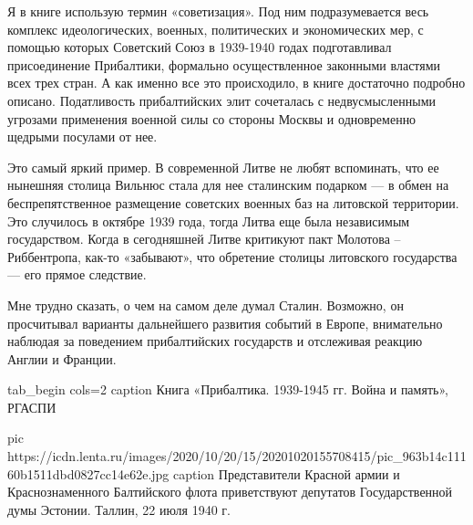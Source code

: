 
Я в книге использую термин «советизация». Под ним подразумевается весь комплекс
идеологических, военных, политических и экономических мер, с помощью которых
Советский Союз в 1939-1940 годах подготавливал присоединение Прибалтики,
формально осуществленное законными властями всех трех стран. А как именно все
это происходило, в книге достаточно подробно описано. Податливость
прибалтийских элит сочеталась с недвусмысленными угрозами применения военной
силы со стороны Москвы и одновременно щедрыми посулами от нее.


Это самый яркий пример. В современной Литве не любят вспоминать, что ее
нынешняя столица Вильнюс стала для нее сталинским подарком — в обмен на
беспрепятственное размещение советских военных баз на литовской территории. Это
случилось в октябре 1939 года, тогда Литва еще была независимым государством.
Когда в сегодняшней Литве критикуют пакт Молотова – Риббентропа, как-то
«забывают», что обретение столицы литовского государства — его прямое
следствие.


Мне трудно сказать, о чем на самом деле думал Сталин. Возможно, он просчитывал
варианты дальнейшего развития событий в Европе, внимательно наблюдая за
поведением прибалтийских государств и отслеживая реакцию Англии и Франции.

\ifcmt
tab_begin cols=2
	caption Книга «Прибалтика. 1939-1945 гг. Война и память», РГАСПИ

	pic https://icdn.lenta.ru/images/2020/10/20/15/20201020155708415/pic_963b14c11160b1511dbd0827cc14e62e.jpg
	caption Представители Красной армии и Краснознаменного Балтийского флота приветствуют депутатов Государственной думы Эстонии. Таллин, 22 июля 1940 г.

